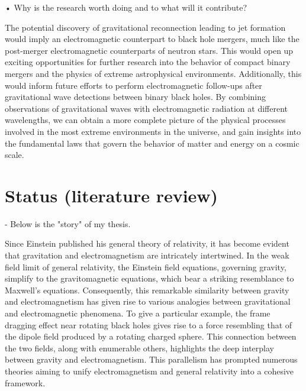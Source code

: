 • Why is the research worth doing and to what will it contribute?

The potential discovery of gravitational reconnection leading to jet formation would imply an electromagnetic counterpart to black hole mergers, much like the post-merger electromagnetic counterparts of neutron stars. This would open up exciting opportunities for further research into the behavior of compact binary mergers and the physics of extreme astrophysical environments. Additionally, this would inform future efforts to perform electromagnetic follow-ups after gravitational wave detections between binary black holes. By combining observations of gravitational waves with electromagnetic radiation at different wavelengths, we can obtain a more complete picture of the physical processes involved in the most extreme environments in the universe, and gain insights into the fundamental laws that govern the behavior of matter and energy on a cosmic scale.


\section{Status (literature review)}

- Below is the "story" of my thesis.

Since Einstein published his general theory of relativity, it has become evident that gravitation and electromagnetism are intricately intertwined. In the weak field limit of general relativity, the Einstein field equations, governing gravity, simplify to the gravitomagnetic equations, which bear a striking resemblance to Maxwell's equations. Consequently, this remarkable similarity between gravity and electromagnetism has given rise to various analogies between gravitational and electromagnetic phenomena. To give a particular example, the frame dragging effect near rotating black holes gives rise to a force resembling that of the dipole field produced by a rotating charged sphere. This connection between the two fields, along with enumerable others, highlights the deep interplay between gravity and electromagnetism. This parallelism has prompted numerous theories aiming to unify electromagnetism and general relativity into a cohesive framework.

